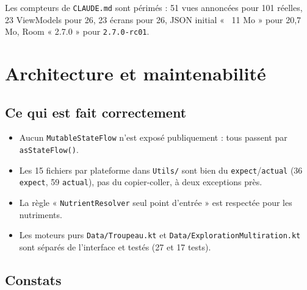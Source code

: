 \documentclass[11pt,a4paper]{article}
\newcommand{\fichier}[1]{\texttt{\small #1}}
\newcommand{\code}[1]{\texttt{#1}}
\begin{document}
Les compteurs de \fichier{CLAUDE.md} sont périmés : 51 vues annoncées pour 101 réelles, 23
ViewModels pour 26, 23 écrans pour 26, JSON initial « ~11 Mo » pour 20,7 Mo, Room « 2.7.0 » pour
\code{2.7.0-rc01}.

\section{Architecture et maintenabilité}\label{sec:architecture}

\subsection*{Ce qui est fait correctement}

\begin{itemize}
\item Aucun \code{MutableStateFlow} n'est exposé publiquement : tous passent par \code{asStateFlow()}.
\item Les 15 fichiers par plateforme dans \fichier{Utils/} sont bien du \code{expect}/\code{actual}
  (36 \code{expect}, 59 \code{actual}), pas du copier-coller, à deux exceptions près.
\item La règle « \code{NutrientResolver} seul point d'entrée » est respectée pour les nutriments.
\item Les moteurs purs \fichier{Data/Troupeau.kt} et \fichier{Data/ExplorationMultiration.kt} sont
  séparés de l'interface et testés (27 et 17 tests).
\end{itemize}

\subsection*{Constats}
\end{document}
